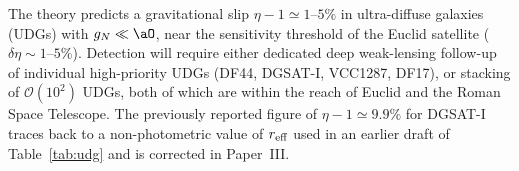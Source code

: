 %
%
%
The theory predicts a gravitational slip
$\eta-1 \simeq 1$--$5\%$ in ultra-diffuse galaxies (UDGs)
with $g_N \ll \aO$, near the sensitivity threshold of the
Euclid satellite ($\delta\eta \sim 1$--$5\%$). Detection
will require either dedicated deep weak-lensing follow-up
of individual high-priority UDGs (DF44, DGSAT-I, VCC1287,
DF17), or stacking of $\mathcal{O}(10^2)$ UDGs, both of
which are within the reach of Euclid and the Roman Space
Telescope. The previously reported figure of
$\eta-1 \simeq 9.9\%$ for DGSAT-I traces back to a
non-photometric value of $r_{\rm eff}$ used in an earlier
draft of Table~\ref{tab:udg} and is corrected in Paper~III.
